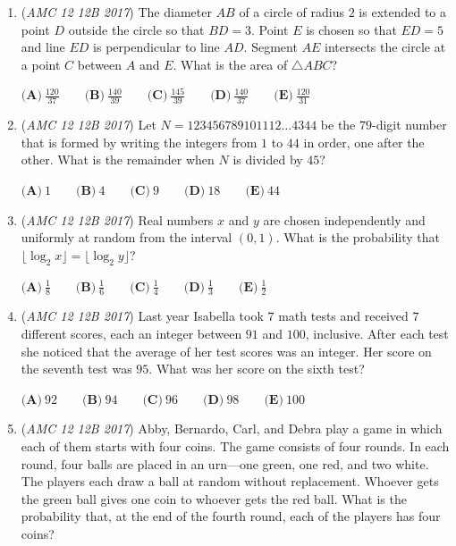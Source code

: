 \begin{enumerate}
 

	\item (\textit{AMC 12 12B 2017}) The diameter $AB$ of a circle of radius $2$ is extended to a point $D$ outside the circle so that $BD=3$. Point $E$ is chosen so that $ED=5$ and line $ED$ is perpendicular to line $AD$. Segment $AE$ intersects the circle at a point $C$ between $A$ and $E$. What is the area of $\triangle  ABC$?


 $\textbf{(A)}\ \frac{120}{37}\qquad\textbf{(B)}\ \frac{140}{39}\qquad\textbf{(C)}\ \frac{145}{39}\qquad\textbf{(D)}\ \frac{140}{37}\qquad\textbf{(E)}\ \frac{120}{31}$


	\item (\textit{AMC 12 12B 2017}) Let $N=123456789101112\dots4344$ be the $79$-digit number that is formed by writing the integers from $1$ to $44$ in order, one after the other. What is the remainder when $N$ is divided by $45$?


 $\textbf{(A)}\ 1\qquad\textbf{(B)}\ 4\qquad\textbf{(C)}\ 9\qquad\textbf{(D)}\ 18\qquad\textbf{(E)}\ 44$


	\item (\textit{AMC 12 12B 2017}) Real numbers $x$ and $y$ are chosen independently and uniformly at random from the interval $(0,1)$. What is the probability that $\lfloor\log_2x\rfloor=\lfloor\log_2y\rfloor$?


 $\textbf{(A)}\ \frac{1}{8}\qquad\textbf{(B)}\ \frac{1}{6}\qquad\textbf{(C)}\ \frac{1}{4}\qquad\textbf{(D)}\ \frac{1}{3}\qquad\textbf{(E)}\ \frac{1}{2}$


	\item (\textit{AMC 12 12B 2017}) Last year Isabella took $7$ math tests and received $7$ different scores, each an integer between $91$ and $100$, inclusive. After each test she noticed that the average of her test scores was an integer. Her score on the seventh test was $95$. What was her score on the sixth test?


 $\textbf{(A)}\ 92\qquad\textbf{(B)}\ 94\qquad\textbf{(C)}\ 96\qquad\textbf{(D)}\ 98\qquad\textbf{(E)}\ 100$


	\item (\textit{AMC 12 12B 2017}) Abby, Bernardo, Carl, and Debra play a game in which each of them starts with four coins. The game consists of four rounds. In each round, four balls are placed in an urn---one green, one red, and two white. The players each draw a ball at random without replacement. Whoever gets the green ball gives one coin to whoever gets the red ball. What is the probability that, at the end of the fourth round, each of the players has four coins?



\end{enumerate}
